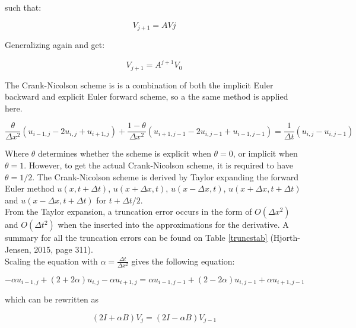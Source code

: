 \documentclass[10pt,a4paper]{article}
\begin{document}
\noindent such that:

\begin{equation}
V_{j+1} = AVj
\end{equation}

\noindent Generalizing again and get:

\begin{equation}
V_{j+1}= A^{j+1}V_{0}
\end{equation}

\noindent The Crank-Nicolson scheme is is a combination of both the implicit Euler backward and explicit Euler forward scheme, so a the same method is applied here.

\begin{equation}
\frac{\theta}{\Delta x^2}(u_{i-1,j} - 2u_{i,j} + u_{i+1,j}) + \frac{1 - \theta}{\Delta x^2}(u_{i+1,j-1} - 2u_{i,j-1} + u_{i-1,j-1}) = \frac{1}{\Delta t}(u_{i,j} - u_{i,j-1})
\end{equation}

\noindent Where $\theta$ determines whether the scheme is explicit when $\theta = 0$, or implicit when $\theta = 1$. However, to get the actual Crank-Nicolson scheme, it is required to have $\theta = 1/2$. The Crank-Nicolson scheme is derived by Taylor expanding the forward Euler method $u(x,t + \Delta t)$, $u(x + \Delta x,t)$, $u(x - \Delta x,t)$, $u(x + \Delta x, t + \Delta t)$ and $u(x - \Delta x, t + \Delta t)$ for $t + \Delta t/2$.\\

\noindent From the Taylor expansion, a truncation error occurs in the form of $O(\Delta x^2)$ and $O(\Delta t^2)$ when the inserted into the approximations for the derivative. A summary for all the truncation errors can be found on Table \ref{truncstab} (Hjorth-Jensen, 2015, page 311).\\

\noindent Scaling the equation with $\alpha = \frac{\Delta t}{\Delta x^2}$ gives the following equation:

\begin{equation}
-\alpha u_{i-1,j} + (2 + 2\alpha)u_{i,j} -\alpha u_{i+1,j} = \alpha u_{i-1,j-1} + (2-2\alpha)u_{i,j-1} + \alpha u_{i+1,j-1}
\end{equation}

\noindent which can be rewritten as

\begin{equation}
(2I + \alpha B)V_j = (2I - \alpha B)V_{j-1}
\end{equation}
\end{document}
